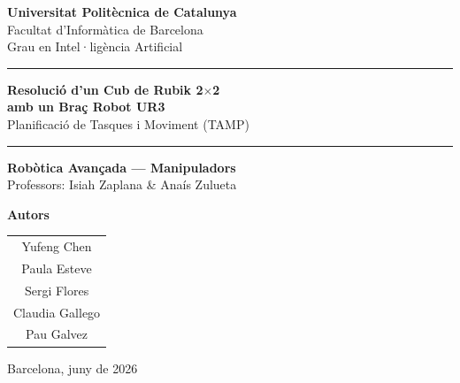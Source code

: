 \documentclass[12pt, a4paper]{article}
\begin{document}
\begin{titlepage}
  \centering

  \vspace*{0.5cm}

  \vspace{1.5cm}

  {\large \textbf{Universitat Politècnica de Catalunya}}\\[0.2cm]
  {\large Facultat d'Informàtica de Barcelona}\\[0.1cm]
  {\normalsize Grau en Intel·ligència Artificial}

  \vspace{1.5cm}
  \noindent\rule{\textwidth}{1.5pt}
  \vspace{0.4cm}

  {\LARGE \textbf{Resolució d'un Cub de Rubik 2$\times$2}}\\[0.5cm]
  {\Large \textbf{amb un Braç Robot UR3}}\\[0.3cm]
  {\large Planificació de Tasques i Moviment (TAMP)}

  \vspace{0.4cm}
  \noindent\rule{\textwidth}{1.5pt}

  \vspace{1.2cm}

  {\large \textbf{Robòtica Avançada — Manipuladors}}\\[0.3cm]
  {\normalsize Professors: Isiah Zaplana \& Anaís Zulueta}

  \vfill

  \begin{center}
    \large\textbf{Autors}\\[0.5cm]
    \normalsize
    \begin{tabular}{c}
      Yufeng Chen \\[0.2cm]
      Paula Esteve \\[0.2cm]
      Sergi Flores \\[0.2cm]
      Claudia Gallego \\[0.2cm]
      Pau Galvez \\
    \end{tabular}
  \end{center}

  \vspace{1.5cm}

  {\normalsize Barcelona, juny de 2026}

\end{titlepage}
\end{document}
